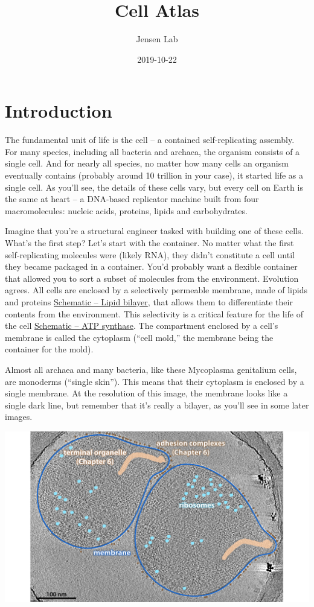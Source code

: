 \documentclass[]{book}
\title{Cell Atlas}
\author{Jensen Lab}
\date{2019-10-22}
\begin{document}
\maketitle

{
\setcounter{tocdepth}{1}
\tableofcontents
}
\hypertarget{bilayer}{\chapter{Introduction}\label{bilayer}}

The fundamental unit of life is the cell -- a contained self-replicating
assembly. For many species, including all bacteria and archaea, the
organism consists of a single cell. And for nearly all species, no
matter how many cells an organism eventually contains (probably around
10 trillion in your case), it started life as a single cell. As you'll
see, the details of these cells vary, but every cell on Earth is the
same at heart -- a DNA-based replicator machine built from four
macromolecules: nucleic acids, proteins, lipids and carbohydrates.

Imagine that you're a structural engineer tasked with building one of
these cells. What's the first step? Let's start with the container. No
matter what the first self-replicating molecules were (likely RNA), they
didn't constitute a cell until they became packaged in a container.
You'd probably want a flexible container that allowed you to sort a
subset of molecules from the environment. Evolution agrees. All cells
are enclosed by a selectively permeable membrane, made of lipids and
proteins \protect\hyperlink{bilayer}{Schematic -- Lipid bilayer}, that
allows them to differentiate their contents from the environment. This
selectivity is a critical feature for the life of the cell
\protect\hyperlink{atp}{Schematic -- ATP synthase}. The compartment
enclosed by a cell's membrane is called the cytoplasm (``cell mold,''
the membrane being the container for the mold).

Almost all archaea and many bacteria, like these Mycoplasma genitalium
cells, are monoderms (``single skin''). This means that their cytoplasm
is enclosed by a single membrane. At the resolution of this image, the
membrane looks like a single dark line, but remember that it's really a
bilayer, as you'll see in some later images.

\includegraphics{img/02_static/2_1_Mgenitalium.jpg}
\end{document}
